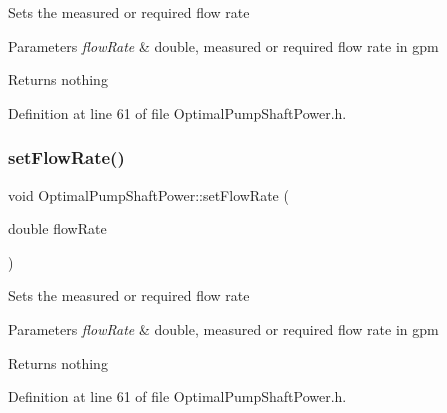 Sets the measured or required flow rate


\begin{DoxyParams}{Parameters}
{\em flow\+Rate} & double, measured or required flow rate in gpm\\
\hline
\end{DoxyParams}
\begin{DoxyReturn}{Returns}
nothing 
\end{DoxyReturn}


Definition at line 61 of file Optimal\+Pump\+Shaft\+Power.\+h.

\mbox{\label{class_optimal_pump_shaft_power_a38efdee39db4c3856915f1ab26d44ed2}} 
\subsubsection{\texorpdfstring{set\+Flow\+Rate()}{setFlowRate()}\hspace{0.1cm}{\footnotesize\ttfamily [2/3]}}
{\footnotesize\ttfamily void Optimal\+Pump\+Shaft\+Power\+::set\+Flow\+Rate (\begin{DoxyParamCaption}\item[{double}]{flow\+Rate }\end{DoxyParamCaption})\hspace{0.3cm}{\ttfamily [inline]}}

Sets the measured or required flow rate


\begin{DoxyParams}{Parameters}
{\em flow\+Rate} & double, measured or required flow rate in gpm\\
\hline
\end{DoxyParams}
\begin{DoxyReturn}{Returns}
nothing 
\end{DoxyReturn}


Definition at line 61 of file Optimal\+Pump\+Shaft\+Power.\+h.

\mbox{\label{class_optimal_pump_shaft_power_a38efdee39db4c3856915f1ab26d44ed2}} 
